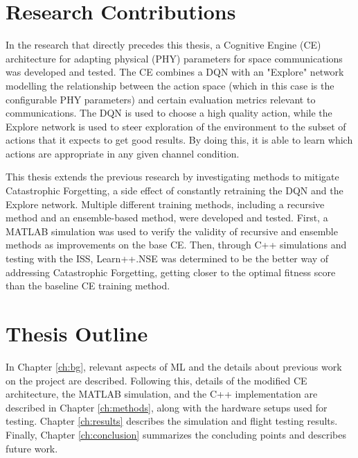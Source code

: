\section{Research Contributions}
\par In the research that directly precedes this thesis\cite{paulo_theory_paper}\cite{tim_implementation_paper}, a Cognitive Engine (CE) architecture for adapting physical (PHY) parameters for space communications was developed and tested. The CE combines a DQN with an "Explore" network modelling the relationship between the action space (which in this case is the configurable PHY parameters) and certain evaluation metrics relevant to communications. The DQN is used to choose a high quality action, while the Explore network is used to steer exploration of the environment to the subset of actions that it expects to get good results. By doing this, it is able to learn which actions are appropriate in any given channel condition.  
\par This thesis extends the previous research by investigating methods to mitigate Catastrophic Forgetting, a side effect of constantly retraining the DQN and the Explore network. Multiple different training methods, including a recursive method and an ensemble-based method, were developed and tested. First, a MATLAB simulation was used to verify the validity of recursive and ensemble methods as improvements on the base CE. Then, through C++ simulations and testing with the ISS, Learn++.NSE was determined to be the better way of addressing Catastrophic Forgetting, getting closer to the optimal fitness score than the baseline CE training method. 

\section{Thesis Outline}
\par In Chapter \ref{ch:bg}, relevant aspects of ML and the details about previous work on the project are described. Following this, details of the modified CE architecture, the MATLAB simulation, and the C++ implementation are described in Chapter \ref{ch:methods}, along with the hardware setups used for testing. Chapter \ref{ch:results} describes the simulation and flight testing results. Finally, Chapter \ref{ch:conclusion} summarizes the concluding points and describes future work.
